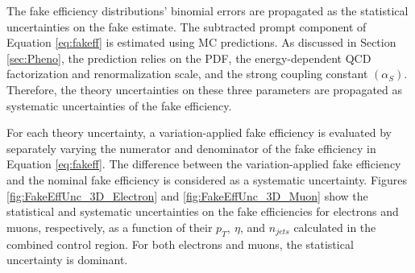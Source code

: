 The fake efficiency distributions' binomial errors are propagated as the statistical uncertainties on the fake estimate. The subtracted prompt component of Equation \ref{eq:fakeff} is estimated using MC predictions. As discussed in Section \ref{sec:Pheno}, the prediction relies on the PDF, the energy-dependent QCD factorization and renormalization scale, and the strong coupling constant $(\alpha_{S})$. Therefore, the theory uncertainties on these three parameters are propagated as systematic uncertainties of the fake efficiency. 

For each theory uncertainty, a variation-applied fake efficiency is evaluated by separately varying the numerator and denominator of the fake efficiency in Equation \ref{eq:fakeff}. The difference between the variation-applied fake efficiency and the nominal fake efficiency is considered as a systematic uncertainty. Figures \ref{fig:FakeEffUnc_3D_Electron} and \ref{fig:FakeEffUnc_3D_Muon} show the statistical and systematic uncertainties on the fake efficiencies for electrons and muons, respectively, as a function of their $p_{T},~\eta$, and $n_{jets}$ calculated in the combined control region. For both electrons and muons, the statistical uncertainty is dominant.

